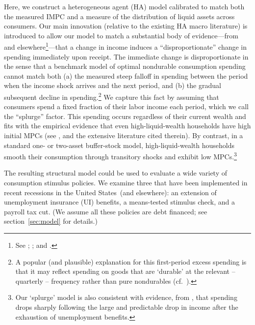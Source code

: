 \documentclass[\econtexRoot/HAFiscal]{subfiles}
\begin{document}
Here, we construct a heterogeneous agent (HA) model calibrated to match both the measured IMPC and a measure of the distribution of liquid assets across consumers.  Our main innovation (relative to the existing HA macro literature) is introduced to allow our model to match a substantial body of evidence---from \cite{fagereng_mpc_2021} and elsewhere\footnote{See \cite{parker2013consumer}; \cite{ganongConsumer2019}; and \cite{olafsson2018liquid}.}---that a change in income induces a ``disproportionate'' change in spending immediately upon receipt.  The immediate change is disproportionate in the sense that a benchmark model of optimal nondurable consumption spending cannot match both (a) the measured steep falloff in spending between the period when the income shock arrives and the next period, and (b) the gradual subsequent decline in spending.\footnote{A popular (and plausible) explanation for this first-period excess spending is that it may reflect spending on goods that are `durable' at the relevant -- quarterly -- frequency rather than pure nondurables (cf.\ \cite{laibson2022simple}).}  We capture this fact by assuming that consumers spend a fixed fraction of their labor income each period, which we call the ``splurge'' factor. This spending occurs regardless of their current wealth and fits with the empirical evidence that even high-liquid-wealth households have high initial MPCs (see \cite{crawleyMicroMacro}, and the extensive literature cited therein).  By contrast, in a standard one- or two-asset buffer-stock model, high-liquid-wealth households smooth their consumption through transitory shocks and exhibit low MPCs.\footnote{Our `splurge' model is also consistent with evidence, from \cite{ganongConsumer2019}, that spending drops sharply following the large and predictable drop in income after the exhaustion of unemployment benefits.}

The resulting structural model could be used to evaluate a wide variety of consumption stimulus policies.  We examine three that have been implemented in recent recessions in the United States\ (and elsewhere): an extension of unemployment insurance (UI) benefits, a means-tested stimulus check, and a payroll tax cut.  (We assume all these policies are debt financed; see section~\ref{sec:model} for details.)  %
\end{document}
